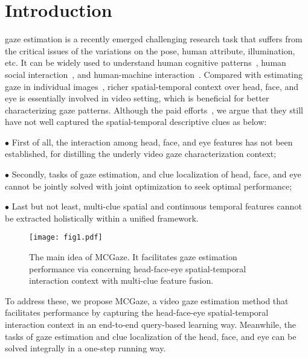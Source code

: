 \documentclass[journal]{IEEEtran}
\begin{document}
\section{Introduction}
 gaze estimation is a recently emerged challenging research task that suffers from the critical issues of the variations on the pose, human attribute, illumination, etc.
It can be widely used to understand human cognitive patterns~\cite{henderson2003human, SPL_gaze_object_segment}, 
human social interaction~\cite{fan2018inferring, fan2019understanding, emery2000eyes}, 
and human-machine interaction~\cite{zhang2019evaluation}. Compared with estimating gaze in individual images~\cite{zhang2015appearance}, richer spatial-temporal context over head, face, and eye is essentially involved in video setting, which is beneficial for better characterizing gaze patterns.
Although the paid efforts~\cite{2eye_gaze,nonaka2022dynamic,bao2021adaptive,cheng2020coarse,tip_gaze}, we argue that they still have not well captured the spatial-temporal descriptive clues as below: 

$\bullet$ First of all, the interaction among head, face, and eye features has not been established, for distilling the underly video gaze characterization context;

$\bullet$ Secondly, tasks of gaze estimation, and clue localization of head, face, and eye cannot be jointly solved with joint optimization to seek optimal performance; 

$\bullet$ Last but not least, multi-clue spatial and continuous temporal features cannot be extracted holistically within a unified framework.

\begin{figure}[t]
\centerline{\texttt{[image: fig1.pdf]}}
\caption{The main idea of MCGaze. It facilitates gaze estimation performance via concerning head-face-eye spatial-temporal interaction context with multi-clue feature fusion.}
\label{fig:main_idea}
\vspace{-4mm}
\end{figure}

To address these, we propose MCGaze, a video gaze estimation method that facilitates performance by capturing the head-face-eye spatial-temporal interaction context in an end-to-end query-based learning way. Meanwhile, the tasks of gaze estimation and clue localization of the head, face, and eye can be solved integrally in a one-step running way.
\end{document}

